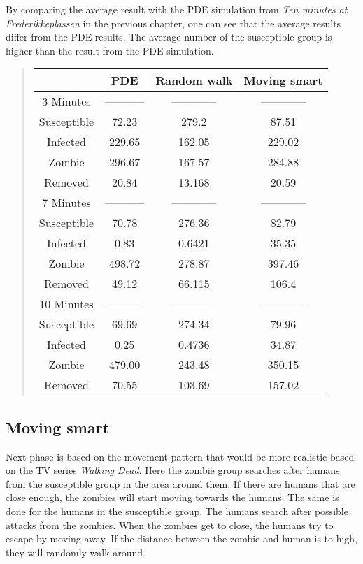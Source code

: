 \documentclass[%
twoside,                 %
final,                   %
chapterprefix=true,      %
open=right               %
10pt]{book}
\begin{document}
By comparing the average result with the PDE simulation from \emph{Ten minutes at Frederikkeplassen} in the previous chapter, one can see that the average results differ from the PDE results. The average number of the susceptible group is higher than the result from the PDE simulation. 

\label{table:frederikke_table_random}

\begin{quote}
\begin{tabular}{cccc}
\hline
\multicolumn{1}{c}{  } & \multicolumn{1}{c}{ PDE } & \multicolumn{1}{c}{ Random walk } & \multicolumn{1}{c}{ Moving smart } \\
\hline
3 Minutes   & ----------- & ------------ & ------------ \\
\hline
Susceptible & 72.23       & 279.2        & 87.51        \\
Infected    & 229.65      & 162.05       & 229.02       \\
Zombie      & 296.67      & 167.57       & 284.88       \\
Removed     & 20.84       & 13.168       & 20.59        \\
\hline
7 Minutes   & ----------- & ------------ & ------------ \\
\hline
Susceptible & 70.78       & 276.36       & 82.79        \\
Infected    & 0.83        & 0.6421       & 35.35        \\
Zombie      & 498.72      & 278.87       & 397.46       \\
Removed     & 49.12       & 66.115       & 106.4        \\
\hline
10 Minutes  & ----------- & ------------ & ------------ \\
\hline
Susceptible & 69.69       & 274.34       & 79.96        \\
Infected    & 0.25        & 0.4736       & 34.87        \\
Zombie      & 479.00      & 243.48       & 350.15       \\
Removed     & 70.55       & 103.69       & 157.02       \\
\hline
\end{tabular}
\end{quote}

\noindent



\subsection{Moving smart}
Next phase is based on the movement pattern that would be more realistic based on the TV series \emph{Walking Dead}. Here the zombie group searches after humans from the susceptible group in the area around them. If there are humans that are close enough, the zombies will start moving towards the humans. The same is done for the humans in the susceptible group. The humans search after possible attacks from the zombies. When the zombies get to close, the humans try to escape by moving away. If the distance between the zombie and human is to high, they will randomly walk around. 
\end{document}
